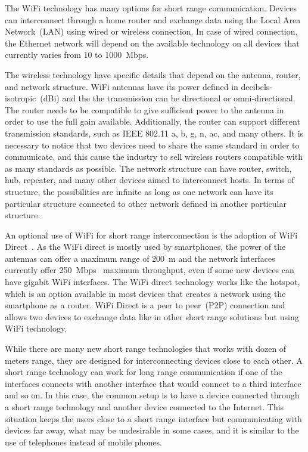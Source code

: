 The WiFi technology has many options for short range communication.
Devices can interconnect through a home router and exchange data using the Local Area Network~(LAN) using wired or wireless connection.
In case of wired connection, the Ethernet network will depend on the available technology on all devices that currently varies from 10 to 1000~Mbps.

The wireless technology have specific details that depend on the antenna, router, and network structure.
WiFi antennas have its power defined in decibels-isotropic~(dBi) and the the transmission can be directional or omni-directional.
The router needs to be compatible to give sufficient power to the antenna in order to use the full gain available.
Additionally, the router can support different transmission standards, such as IEEE 802.11 a, b, g, n, ac, and many others.
It is necessary to notice that two devices need to share the same standard in order to communicate, and this cause the industry to sell wireless routers compatible with as many standards as possible.
The network structure can have router, switch, hub, repeater, and many other devices aimed to interconnect hosts.
In terms of structure, the possibilities are infinite as long as one network can have its particular structure connected to other network defined in another particular structure.

An optional use of WiFi for short range interconnection is the adoption of WiFi Direct~\citep{Alliance2010wifii}.
As the WiFi direct is mostly used by smartphones, the power of the antennas can offer a maximum range of 200~m and the network interfaces currently offer 250~Mbps~\citep{Feng2014d2d} maximum throughput, even if some new devices can have gigabit WiFi interfaces.
The WiFi direct technology works like the hotspot, which is an option available in most devices that creates a network using the smartphone as a router.
WiFi Direct is a peer to peer~(P2P) connection and allows two devices to exchange data like in other short range solutions but using WiFi technology.

While there are many new short range technologies that works with dozen of meters range, they are designed for interconnecting devices close to each other.
A short range technology can work for long range communication if one of the interfaces connects with another interface that would connect to a third interface and so on.
In this case, the common setup is to have a device connected through a short range technology and another device connected to the Internet.
This situation keeps the users close to a short range interface but communicating with devices far away, what may be undesirable in some cases, and it is similar to the use of telephones instead of mobile phones. 

